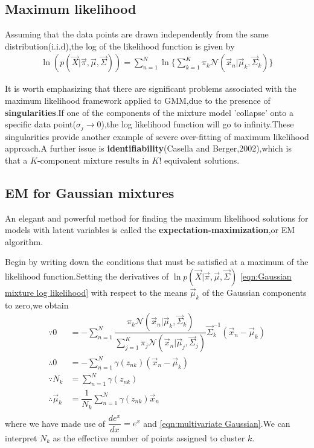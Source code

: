 \subsection{Maximum likelihood}
Assuming that the data points are drawn independently from the same distribution(i.i.d),the log of the likelihood function is given by
\begin{align}\label{eqn:Gaussian mixture log likelihood}
\ln(p(\vec{X}|\vec{\pi},\vec{\mu},\vec{\Sigma})) =
\sum_{n=1}^{N}\ln\{\sum_{k=1}^{K}\pi_k\mathcal{N}(\vec{x}_n|\vec{\mu}_k,\vec{\Sigma}_k) \}
\end{align}

It is worth emphasizing that there are significant problems associated with the maximum likelihood framework applied to GMM,due to the presence of \textbf{singularities}.If one of the components of the mixture model 'collapse' onto a specific data point($\sigma_j\rightarrow 0$),the log likelihood function will go to infinity.These singularities provide another example of severe over-fitting of maximum likelihood approach.A further issue is \textbf{identifiability}(Casella and Berger,2002),which is that a $K$-component mixture results in $K!$ equivalent solutions.

\subsection{EM for Gaussian mixtures}
An elegant and powerful method for finding the maximum likelihood solutions for models with latent variables is called the \textbf{expectation-maximization},or EM algorithm.

Begin by writing down the conditions that must be satisfied at a maximum of the likelihood function.Setting the derivatives of $\ln p(\vec{X}|\vec{\pi},\vec{\mu},\vec{\Sigma})$ \ref{eqn:Gaussian mixture log likelihood} with respect to the means $\vec{\mu}_k$ of the Gaussian components to zero,we obtain
\begin{align}
\because 0&=-\sum_{n=1}^{N}\dfrac{\pi_k\mathcal{N}(\vec{x}_n|\vec{\mu}_k,\vec{\Sigma}_k)}
{\sum_{j=1}^{K}\pi_j\mathcal{N}(\vec{x}_n|\vec{\mu}_j,\vec{\Sigma}_j)}
\vec{\Sigma}_k^{-1}(\vec{x}_n-\vec{\mu}_k) \\
\therefore 0&=-\sum_{n=1}^{N}\gamma(z_{nk})(\vec{x}_n-\vec{\mu}_k) \\
\because
N_k&=\sum_{n=1}^{N}\gamma(z_{nk}) \\
\therefore \vec{\mu}_k&=\dfrac{1}{N_k}\sum_{n=1}^{N}\gamma(z_{nk})\vec{x}_n \\
\end{align}
where we have made use of $\dfrac{de^x}{dx}=e^x$ and \ref{eqn:multivariate Gaussian}.We can interpret $N_k$ as the effective number of points assigned to cluster $k$.

